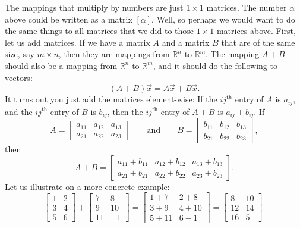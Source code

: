 The mappings that multiply by numbers are just $1 \times 1$ matrices.  The
number $\alpha$ above could be written as a matrix $[\alpha]$.
Well, so perhaps we would want to do the same things to all matrices that we
did to those $1 \times 1$ matrices above.  First, let us add matrices.
If we have a matrix $A$ and a matrix $B$ that are of the same size,
say $m \times n$, then they are mappings from
${\mathbb{R}}^n$ to ${\mathbb{R}}^m$.  The mapping $A+B$ should also be a mapping from
${\mathbb{R}}^n$ to ${\mathbb{R}}^m$, and it should do the following to
vectors:
\begin{equation*}
(A+B) \vec{x} = A\vec{x} + B \vec{x} .
\end{equation*}
It turns out you just add the matrices element-wise:  If the
$ij^{\text{th}}$ entry of $A$ is $a_{ij}$, and the
$ij^{\text{th}}$ entry of $B$ is $b_{ij}$, then the
$ij^{\text{th}}$ entry of $A+B$ is $a_{ij} + b_{ij}$.  If
\begin{equation*}
A = 
\begin{bmatrix}
a_{11} & a_{12} & a_{13}  \\
a_{21} & a_{22} & a_{23}
\end{bmatrix}
\qquad \text{and} \qquad
B = 
\begin{bmatrix}
b_{11} & b_{12} & b_{13}  \\
b_{21} & b_{22} & b_{23}
\end{bmatrix} ,
\end{equation*}
then
\begin{equation*}
A+B = 
\begin{bmatrix}
a_{11} + b_{11} & a_{12} + b_{12} & a_{13} + b_{13}  \\
a_{21} + b_{21} & a_{22} + b_{22} & a_{23} + b_{23}
\end{bmatrix} .
\end{equation*}
Let us illustrate on a more concrete example:
\begin{equation*}
\begin{bmatrix}
1 & 2 \\
3 & 4 \\
5 & 6
\end{bmatrix}
+
\begin{bmatrix}
7 & 8 \\
9 & 10 \\
11 & -1
\end{bmatrix}
=
\begin{bmatrix}
1+7 & 2+8 \\
3+9 & 4+10 \\
5+11 & 6-1
\end{bmatrix}
=
\begin{bmatrix}
8 & 10 \\
12 & 14 \\
16 & 5
\end{bmatrix} .
\end{equation*}

